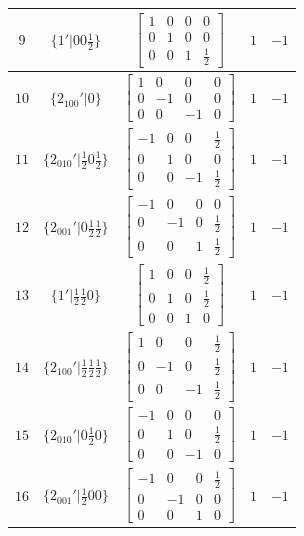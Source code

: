 \documentclass[fleqn,8pt]{jsarticle}
\begin{document}
\begin{longtable}{ccccc}
$ 9 $ & $ \{1{}'|0 0 \frac{1}{2}\} $ & $ \begin{bmatrix} 1 & 0 & 0 & 0 \\ 0 & 1 & 0 & 0 \\ 0 & 0 & 1 & \frac{1}{2} \end{bmatrix} $ & $ 1 $ & $ -1 $ \\ \hline
$ 10 $ & $ \{2{}_{100}{}'|0\} $ & $ \begin{bmatrix} 1 & 0 & 0 & 0 \\ 0 & -1 & 0 & 0 \\ 0 & 0 & -1 & 0 \end{bmatrix} $ & $ 1 $ & $ -1 $ \\ \hline
$ 11 $ & $ \{2{}_{010}{}'|\frac{1}{2} 0 \frac{1}{2}\} $ & $ \begin{bmatrix} -1 & 0 & 0 & \frac{1}{2} \\ 0 & 1 & 0 & 0 \\ 0 & 0 & -1 & \frac{1}{2} \end{bmatrix} $ & $ 1 $ & $ -1 $ \\ \hline
$ 12 $ & $ \{2{}_{001}{}'|0 \frac{1}{2} \frac{1}{2}\} $ & $ \begin{bmatrix} -1 & 0 & 0 & 0 \\ 0 & -1 & 0 & \frac{1}{2} \\ 0 & 0 & 1 & \frac{1}{2} \end{bmatrix} $ & $ 1 $ & $ -1 $ \\ \hline
$ 13 $ & $ \{1{}'|\frac{1}{2} \frac{1}{2} 0\} $ & $ \begin{bmatrix} 1 & 0 & 0 & \frac{1}{2} \\ 0 & 1 & 0 & \frac{1}{2} \\ 0 & 0 & 1 & 0 \end{bmatrix} $ & $ 1 $ & $ -1 $ \\ \hline
$ 14 $ & $ \{2{}_{100}{}'|\frac{1}{2} \frac{1}{2} \frac{1}{2}\} $ & $ \begin{bmatrix} 1 & 0 & 0 & \frac{1}{2} \\ 0 & -1 & 0 & \frac{1}{2} \\ 0 & 0 & -1 & \frac{1}{2} \end{bmatrix} $ & $ 1 $ & $ -1 $ \\ \hline
$ 15 $ & $ \{2{}_{010}{}'|0 \frac{1}{2} 0\} $ & $ \begin{bmatrix} -1 & 0 & 0 & 0 \\ 0 & 1 & 0 & \frac{1}{2} \\ 0 & 0 & -1 & 0 \end{bmatrix} $ & $ 1 $ & $ -1 $ \\ \hline
$ 16 $ & $ \{2{}_{001}{}'|\frac{1}{2} 0 0\} $ & $ \begin{bmatrix} -1 & 0 & 0 & \frac{1}{2} \\ 0 & -1 & 0 & 0 \\ 0 & 0 & 1 & 0 \end{bmatrix} $ & $ 1 $ & $ -1 $ \\
\end{longtable}
\end{document}
